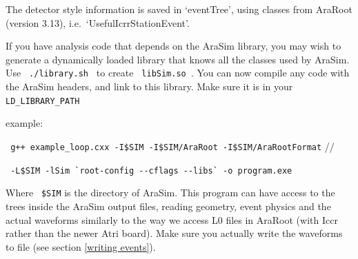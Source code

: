 \documentclass[a4paper,10pt]{article}
\newcommand{\room}{\vspace{0.3cm}}
\newcommand{\arasim}{AraSim\xspace}
\begin{document}
\room

The detector style information is saved in `eventTree', using classes from AraRoot (version 3.13), i.e.~`UsefulIcrrStationEvent'. 








If you have analysis code that depends on the AraSim library, you may wish to generate a dynamically loaded library that knows all the classes used by \arasim. Use \verb| ./library.sh | to create \verb| libSim.so |. You can now compile any code with the AraSim headers, and link to this library. Make sure it is in your \verb| LD_LIBRARY_PATH |

example:


\verb| g++ example_loop.cxx -I$SIM -I$SIM/AraRoot -I$SIM/AraRootFormat| //

\verb| -L$SIM -lSim `root-config --cflags --libs` -o program.exe |

Where \verb| $SIM| is the directory of AraSim. This program can have access to the trees inside the \arasim output files, reading geometry, event physics and the actual waveforms similarly to the way we access L0 files in AraRoot (with Iccr rather than the newer Atri board). Make sure you actually write the waveforms to file (see section \ref{writing events}).
\end{document}

